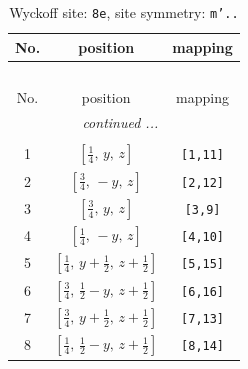 \documentclass[fleqn,8pt]{jsarticle}
\begin{document}
\begin{longtable}{ccc}
\caption{Wyckoff site: {\tt 8e}, site symmetry: {\tt m'..}}
 \\
 \hline \hline
No. & position & mapping \\ \hline \endfirsthead

\multicolumn{2}{l}{\tablename\ \thetable{}} \\
 \hline \hline
No. & position & mapping \\ \hline \endhead

 \hline \hline
\multicolumn{2}{r}{\footnotesize\it continued ...} \\ \endfoot

 \hline \hline
\multicolumn{2}{r}{} \\ \endlastfoot

1 & $\left[ \frac{1}{4},\, y,\, z \right]$ & {\tt [1,11]} \\ \hline
2 & $\left[ \frac{3}{4},\, - y,\, z \right]$ & {\tt [2,12]} \\ \hline
3 & $\left[ \frac{3}{4},\, y,\, z \right]$ & {\tt [3,9]} \\ \hline
4 & $\left[ \frac{1}{4},\, - y,\, z \right]$ & {\tt [4,10]} \\ \hline
5 & $\left[ \frac{1}{4},\, y + \frac{1}{2},\, z + \frac{1}{2} \right]$ & {\tt [5,15]} \\ \hline
6 & $\left[ \frac{3}{4},\, \frac{1}{2} - y,\, z + \frac{1}{2} \right]$ & {\tt [6,16]} \\ \hline
7 & $\left[ \frac{3}{4},\, y + \frac{1}{2},\, z + \frac{1}{2} \right]$ & {\tt [7,13]} \\ \hline
8 & $\left[ \frac{1}{4},\, \frac{1}{2} - y,\, z + \frac{1}{2} \right]$ & {\tt [8,14]} \\
\end{longtable}
\renewcommand{\arraystretch}{1.2}
\end{document}
